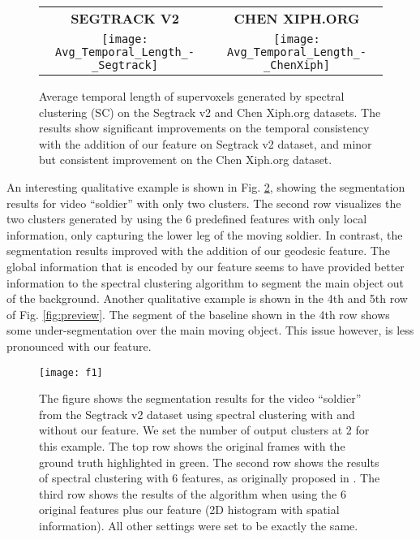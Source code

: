 \documentclass[runningheads]{llncs}
\begin{document}
\begin{figure}[h]
\begin{center}
\begin{adjustbox}{max width=0.9\textwidth }
\begin{tabular}{cc}
\textbf{SEGTRACK V2}&\textbf{\space CHEN XIPH.ORG}\\
\texttt{[image: Avg\_Temporal\_Length\_-\_Segtrack]}&
\texttt{[image: Avg\_Temporal\_Length\_-\_ChenXiph]}\\
\end{tabular}
\end{adjustbox}
\end{center}
\caption{ Average temporal length of supervoxels generated by spectral clustering (SC) \cite{Galasso2013} on the Segtrack v2 and Chen Xiph.org datasets. The results show significant improvements on the temporal consistency with the addition of our feature on Segtrack v2 dataset, and minor but consistent improvement on the Chen Xiph.org dataset.}
\label{tl}
\end{figure}

An interesting qualitative example is shown in Fig. \ref{fig:soldier}, showing the segmentation results for video ``soldier'' with only two clusters. The second row visualizes the two clusters generated by \cite{Galasso2013} using the 6 predefined features with only local information, only capturing the lower leg of the moving soldier. In contrast, the segmentation results improved with the addition of our geodesic feature. The global information that is encoded by our feature seems to have provided better information to the spectral clustering algorithm to segment the main object out of the background. Another qualitative example is shown in the 4th and 5th row of Fig.  \ref{fig:preview}. The segment of the baseline shown in the 4th row shows some under-segmentation over the main moving object. This issue however, is less pronounced with our feature. 

\begin{figure}[!t]
\begin{center}
\texttt{[image: f1]}
\end{center}
\caption{The figure shows the segmentation results for the video ``soldier'' from the Segtrack v2 dataset using  spectral clustering \cite{Galasso2013} with and without our feature. We set the number of output clusters at 2 for this example. The top row shows the original frames with the ground truth highlighted in green. The second row shows the results of spectral clustering with 6 features, as originally proposed in \cite{Galasso2013}. The third row shows the results of the algorithm when using the 6 original features plus our feature (2D histogram with spatial information). All other settings were set to be exactly the same.}
\label{fig:soldier}
\end{figure}
\end{document}
